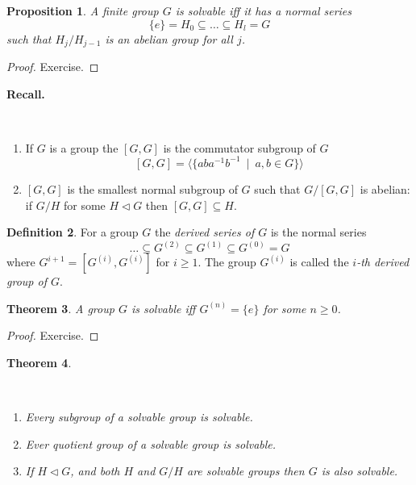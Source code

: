 \documentclass[12pt, letterpaper, oneside]{article}
\theoremstyle{plain}
\newtheorem{theorem}{Theorem}[section]
\newtheorem{proposition}[theorem]{Proposition}
\theoremstyle{definition}
\newtheorem{definition}[theorem]{Definition}
\newcommand{\subgp}[1]{\langle#1\rangle}
\newcommand{\benu}{\begin{enumerate}}
\newcommand{\eenu}{\end{enumerate}}
\newcommand{\vs}{\vskip 5mm}
\newcommand{\isep}[1][0]{\setlength{\itemsep}{#1 mm}}
\begin{document}
\vs\vs

\begin{proposition}
A finite group $G$ is solvable iff it has a normal series 
$$\{e\}= H_{0} \subseteq {\dots} \subseteq H_{l} = G$$
such that $H_{j}/H_{j-1}$ is an abelian group for all $j$.
\end{proposition}

\begin{proof}
Exercise. 
\end{proof}


\newpage

\textbf{Recall.} 

\vskip -13mm
\ 
\benu
\item If $G$ is a group the $[G, G]$ is the commutator subgroup of $G$
$$[G, G] = \subgp{\{aba^{-1}b^{-1} \ \mid \ a, b\in G \}}$$
\item $[G, G]$ is the smallest normal subgroup of $G$ such that $G/[G, G]$ is abelian:
if $G/H$ for some $H\lhd G$ then $[G, G]\subseteq H$.
 \eenu

\vs\vs

\begin{definition}
For a group $G$ the \emph{derived series of $G$} is the normal series
$$\dots \subseteq G^{(2)}\subseteq G^{(1)}\subseteq G^{(0)} =  G$$
where  $G^{i+1} = [G^{(i)}, G^{(i)}]$ for $i\geq 1$. The group $G^{(i)}$ is called 
the \emph{$i$-th derived group of $G$}.
\end{definition}

\vs\vs

\begin{theorem}
A group $G$ is solvable iff $G^{(n)} = \{e\}$ for some $n\geq 0$.
\end{theorem}

\vs

\begin{proof}
Exercise. 
\end{proof}

\vs\vs

\begin{theorem}\ 
\label{THM_SOLVGPSSUBQUOTEXT}

\vskip -13mm

\ 
\benu
\isep
\item Every subgroup of a solvable group is solvable.
\item Ever quotient group of a solvable group is solvable.
\item If $H\lhd G$, and both $H$ and  $G/H$ are solvable groups then  $G$ is also solvable.
\eenu

\end{theorem}
\end{document}
